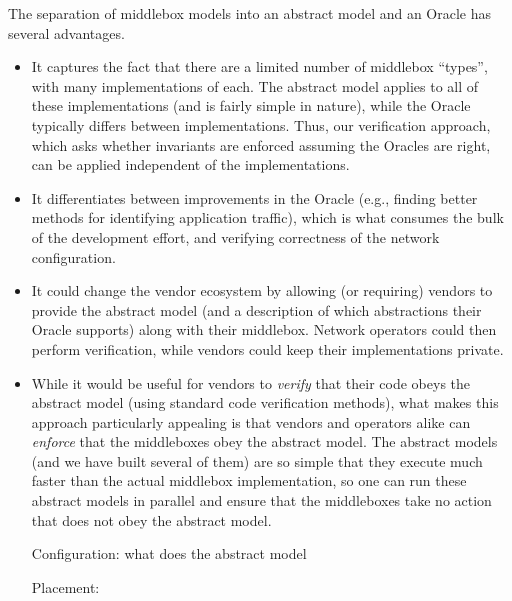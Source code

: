 The separation of middlebox models into an abstract model and an Oracle has several advantages.
\begin{itemize}
\item It captures the fact that there are a limited number of middlebox ``types'', with many implementations of each. The abstract model applies to all of these implementations (and is fairly simple in nature), while the Oracle typically differs between implementations.  Thus, our verification approach, which asks whether invariants are enforced assuming the Oracles are right, can be applied independent of the implementations.
\item It differentiates between improvements in the Oracle (e.g., finding better methods for identifying application traffic), which is what consumes the bulk of the development effort, and verifying correctness of the network configuration.
\item It could change the vendor ecosystem by allowing (or requiring) vendors to provide the abstract model (and a description of which abstractions their Oracle supports) along with their middlebox.
Network operators could then perform verification, while vendors could keep their implementations private.
\item While it would be useful for vendors to {\em verify} that their code obeys the abstract model (using standard code verification methods), what makes this approach particularly appealing is that vendors and operators alike can {\em enforce} that the middleboxes obey the abstract model. The abstract models (and we have built several of them) are so simple that they execute much faster than the actual middlebox implementation, so one can run these abstract models in parallel and ensure that the middleboxes take no action that does not obey the abstract model.


Configuration: what does the abstract model

Placement: 
\end{itemize}


